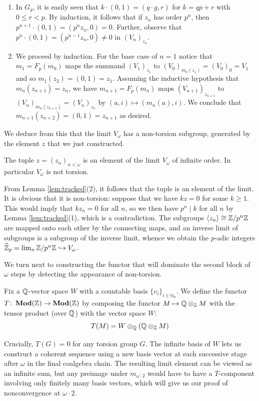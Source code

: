\documentclass[runningheads]{llncs}
\begin{document}
\begin{proofE}
\begin{enumerate}
\item
In $G_g$, it is easily seen that $k\cdot(0,1) = (q\cdot g, r)$ for $k = qp + r$ with $0\le r<p$.
By induction, it follows that if $z_n$ has order $p^n$, then $p^{n+1}\cdot(0,1) = (p^n z_n, 0) = 0$.  
Further,  observe that $p^{n}\cdot(0,1) = (p^{n-1} z_n, 0) \neq 0$ in $(V_n)_{z_n}.$  
\item
We proceed by induction. For the base case of  $n=1$ notice that $m_1 = F_p(m_0)$ maps the summand $(V_1)_{z_1}$ to $(V_0)_{m_0(z_1)} = (V_0)_0 = V_1$ and so $m_1(z_2)=(0,1)= z_1$. 
Assuming the inductive hypothesis that  $m_n(z_{n+1}) = z_n$, we have $m_{n+1}=F_p(m_n)$ maps $(V_{n+1})_{z_{n+1}}$ to $(V_n)_{m_n(z_{n+1})}=(V_n)_{z_n}$ by $(a,i)\mapsto (m_n(a), i)$. We conclude that $m_{n+1}(z_{n+2})= (0,1) =z_{n+1}$ as desired.
\end{enumerate}
\end{proofE}
We deduce from this that the limit $V_\omega$ has a non-torsion subgroup, generated by the element $z$ that we just constructed.
\begin{corollaryE}
\label{cor:padic}
The tuple $z = (z_n)_{n<\omega}$ is an element of the limit $V_\omega$ of infinite order. In particular $V_\omega$ is not torsion.
\end{corollaryE}
\begin{proofE}
From Lemma \ref{lem:tracked}(2), it follows that the tuple is an element of the limit.
It is obvious that it is non-torsion: suppose that we have $kz = 0$ for some $k \ge 1$. 
This would imply that $k z_n = 0$ for all $n$, so we then have $p^n \mid k$ for all $n$ by Lemma \ref{lem:tracked}(1),  which is a contradiction.
The subgroups $\langle z_n\rangle \cong \mathbb{Z}/p^n\mathbb{Z}$ are mapped onto each other by the connecting maps, and an inverse limit of subgroups is a subgroup of the inverse limit,  whence we obtain the $p$-adic integers $\widehat{\mathbb{Z}}_p = \lim_n \mathbb{Z}/p^n\mathbb{Z} \hookrightarrow V_\omega$.
\end{proofE}
We turn next to constructing the functor that will dominate the second block of $\omega$ steps by detecting the appearance of non-torsion.
\begin{definition}
  Fix a $\mathbb{Q}$-vector space $W$ with a countable basis $\{v_i\}_{i \in \mathbb N_0}$.
  We define the functor $T\colon \operatorname{\mathbf{Mod}}(\mathbb{Z}) \to \operatorname{\mathbf{Mod}}(\mathbb{Z})$ by composing the functor $M \mapsto \mathbb{Q} \otimes_{\mathbb{Z}} M$ with the tensor product (over $\mathbb{Q}$) with the vector space $W$:
\begin{equation*}
T(M) = W \otimes_{\mathbb{Q}}\left( \mathbb{Q} \otimes_{\mathbb{Z}}  M\right)
\end{equation*}
\end{definition}
Crucially, $T(G)=0$ for any torsion group $G$.
The infinite basis of $W$ lets us construct a coherent sequence using a new basis vector at each successive stage after $\omega$ in the final coalgebra chain.
The resulting limit element can be viewed as an infinite sum, but any preimage under $m_{\omega\cdot 2}$ would have to have a $T$-component involving only finitely many basis vectors, which will give us our proof of nonconvergence at $\omega \cdot 2$.
\end{document}
